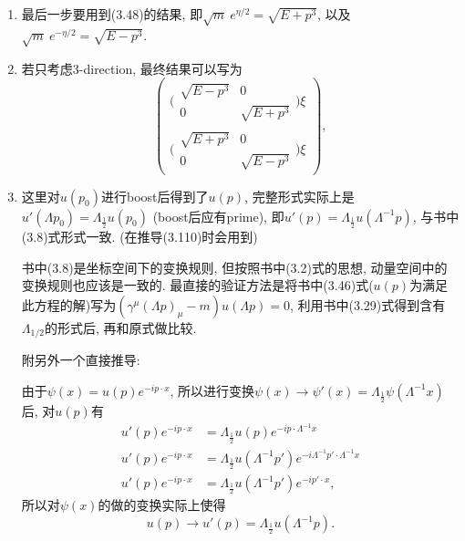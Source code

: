 \begin{enumerate}
  \item \textbf{}最后一步要用到(3.48)的结果, 即$\sqrt{m}\ e^{\eta/2} = \sqrt{E + p^3}$, 以及$\sqrt{m}\ e^{-\eta/2} = \sqrt{E - p^3}$.
  \item \textbf{}若只考虑3-direction, 最终结果可以写为
        \begin{equation}
          \begin{pmatrix}
            \biggl(\begin{smallmatrix}
                     \sqrt{E-p^3} & 0 \\ 0 & \sqrt{E+p^3}
                   \end{smallmatrix}\biggr)\xi \\
            \biggl(\begin{smallmatrix}
                     \sqrt{E+p^3} & 0 \\ 0 & \sqrt{E-p^3}
                   \end{smallmatrix}\biggr)\xi
          \end{pmatrix},
        \end{equation}
  \item \textbf{}这里对$u(p_0)$进行boost后得到了$u(p)$, 完整形式实际上是$u'(\Lambda p_0) = \Lambda_{\frac{1}{2}}u(p_0)$ (boost后应有prime), 即$u'(p) = \Lambda_{\frac{1}{2}}u(\Lambda^{-1}p)$, 与书中(3.8)式形式一致.
        (在推导(3.110)时会用到)
        \begin{mybox}{}
          书中(3.8)是坐标空间下的变换规则, 但按照书中(3.2)式的思想, 动量空间中的变换规则也应该是一致的.
          最直接的验证方法是将书中(3.46)式($u(p)$为满足此方程的解)写为$(\gamma^\mu(\Lambda p)_\mu - m)u(\Lambda p) = 0$, 利用书中(3.29)式得到含有$\Lambda_{1/2}$的形式后, 再和原式做比较.

          \mbox{}

          附另外一个直接推导:

          由于$\psi(x) = u(p)e^{-ip\cdot x}$, 所以进行变换$\psi(x) \rightarrow \psi'(x) = \Lambda_{\frac{1}{2}}\psi(\Lambda^{-1}x)$后, 对$u(p)$有
          \begin{equation}
            \begin{aligned}
              u'(p)e^{-ip\cdot x} & = \Lambda_{\frac{1}{2}}u(p)e^{-ip\cdot \Lambda^{-1}x}                           \\
              u'(p)e^{-ip\cdot x} & = \Lambda_{\frac{1}{2}}u(\Lambda^{-1}p')e^{-i\Lambda^{-1}p'\cdot \Lambda^{-1}x} \\
              u'(p)e^{-ip\cdot x} & = \Lambda_{\frac{1}{2}}u(\Lambda^{-1}p')e^{-ip'\cdot x},
            \end{aligned}
          \end{equation}
          所以对$\psi(x)$的做的变换实际上使得
          \begin{equation}
            u(p) \rightarrow u'(p) = \Lambda_{\frac{1}{2}}u(\Lambda^{-1}p).
          \end{equation}
        \end{mybox}
\end{enumerate}

